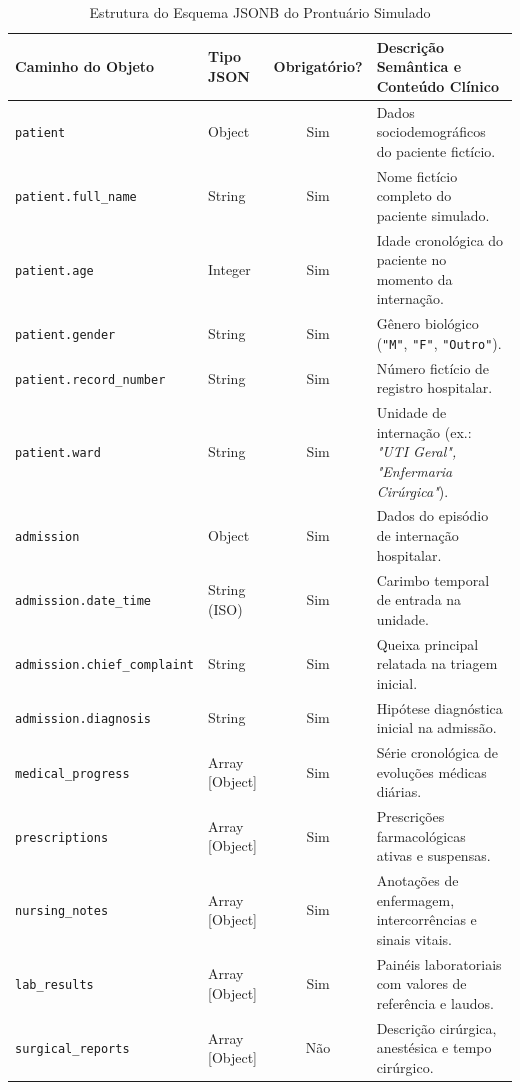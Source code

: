 \begin{table}[!ht]
\centering
\caption{Estrutura do Esquema JSONB do Prontuário Simulado}
\label{tab_schema_prontuario}
\footnotesize
\begin{tabularx}{\textwidth}{p{4.7cm} p{2.1cm} c X}
\toprule
\textbf{Caminho do Objeto} & \textbf{Tipo JSON} & \textbf{Obrigatório?} & \textbf{Descrição Semântica e Conteúdo Clínico} \\
\midrule
\texttt{patient} & Object & Sim & Dados sociodemográficos do paciente fictício. \\
\texttt{patient.full\_name} & String & Sim & Nome fictício completo do paciente simulado. \\
\texttt{patient.age} & Integer & Sim & Idade cronológica do paciente no momento da internação. \\
\texttt{patient.gender} & String & Sim & Gênero biológico (\texttt{"M"}, \texttt{"F"}, \texttt{"Outro"}). \\
\texttt{patient.record\_number} & String & Sim & Número fictício de registro hospitalar. \\
\texttt{patient.ward} & String & Sim & Unidade de internação (ex.: \textit{"UTI Geral", "Enfermaria Cirúrgica"}). \\
\texttt{admission} & Object & Sim & Dados do episódio de internação hospitalar. \\
\texttt{admission.date\_time} & String (ISO) & Sim & Carimbo temporal de entrada na unidade. \\
\texttt{admission.chief\_complaint} & String & Sim & Queixa principal relatada na triagem inicial. \\
\texttt{admission.diagnosis} & String & Sim & Hipótese diagnóstica inicial na admissão. \\
\texttt{medical\_progress} & Array [Object] & Sim & Série cronológica de evoluções médicas diárias. \\
\texttt{prescriptions} & Array [Object] & Sim & Prescrições farmacológicas ativas e suspensas. \\
\texttt{nursing\_notes} & Array [Object] & Sim & Anotações de enfermagem, intercorrências e sinais vitais. \\
\texttt{lab\_results} & Array [Object] & Sim & Painéis laboratoriais com valores de referência e laudos. \\
\texttt{surgical\_reports} & Array [Object] & Não & Descrição cirúrgica, anestésica e tempo cirúrgico. \\
\bottomrule
\end{tabularx}
\end{table}

